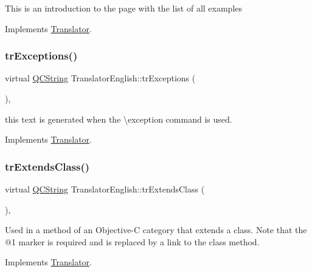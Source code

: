 This is an introduction to the page with the list of all examples 

Implements \mbox{\hyperlink{class_translator}{Translator}}.

\mbox{\label{class_translator_english_a3901aea3db143c58075ccbb51053c267}} 
\subsubsection{\texorpdfstring{trExceptions()}{trExceptions()}}
{\footnotesize\ttfamily virtual \mbox{\hyperlink{class_q_c_string}{Q\+C\+String}} Translator\+English\+::tr\+Exceptions (\begin{DoxyParamCaption}{ }\end{DoxyParamCaption})\hspace{0.3cm}{\ttfamily [inline]}, {\ttfamily [virtual]}}

this text is generated when the \textbackslash{}exception command is used. 

Implements \mbox{\hyperlink{class_translator}{Translator}}.

\mbox{\label{class_translator_english_ae8ccf137297ffe2f66e85e0aa6ce29f4}} 
\subsubsection{\texorpdfstring{trExtendsClass()}{trExtendsClass()}}
{\footnotesize\ttfamily virtual \mbox{\hyperlink{class_q_c_string}{Q\+C\+String}} Translator\+English\+::tr\+Extends\+Class (\begin{DoxyParamCaption}{ }\end{DoxyParamCaption})\hspace{0.3cm}{\ttfamily [inline]}, {\ttfamily [virtual]}}

Used in a method of an Objective-\/C category that extends a class. Note that the @1 marker is required and is replaced by a link to the class method. 

Implements \mbox{\hyperlink{class_translator}{Translator}}.

\mbox{\label{class_translator_english_acd7521b982ea3b5116b65e7fb387c1f8}} 
